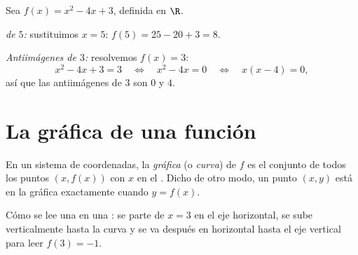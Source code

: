 \begin{example}\label{ex:g10:functions:images}
Sea $f(x) = x^2 - 4x + 3$, definida en $\R$.

\emph{ de $5$:} sustituimos $x = 5$:
$f(5) = 25 - 20 + 3 = 8$.

\emph{Antiimágenes de $3$:} resolvemos $f(x) = 3$:
\[
x^2 - 4x + 3 = 3
\quad\Longleftrightarrow\quad
x^2 - 4x = 0
\quad\Longleftrightarrow\quad
x(x - 4) = 0,
\]
así que las antiimágenes de $3$ son $0$ y $4$.
\end{example}

\section{La gráfica de una función}

\begin{definition}[Gráfica]\label{def:g10:functions:graph}
En un sistema de coordenadas, la \emph{gráfica} (o
\emph{curva}) de $f$ es el conjunto de todos los puntos $(x, f(x))$ con
$x$ en el . Dicho de otro modo, un punto $(x, y)$ está en la
gráfica exactamente cuando $y = f(x)$.
\end{definition}

\begin{omfigure}

{\small Cómo se lee una  en una : se parte de $x = 3$ en el
eje horizontal, se sube verticalmente hasta la curva y se va después en
horizontal hasta el eje vertical para leer $f(3) = -1$.}
\end{omfigure}

